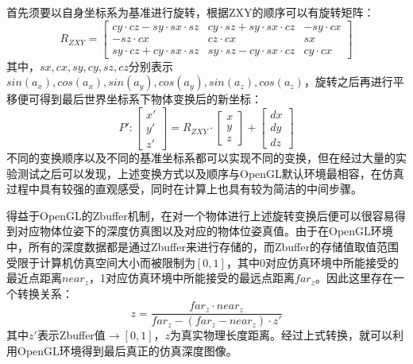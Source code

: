 首先须要以自身坐标系为基准进行旋转，根据ZXY的顺序可以有旋转矩阵：
\begin{equation}
	R_{ZXY}=
	\begin{bmatrix} 
	cy\cdot cz-sy\cdot sx\cdot sz & cy\cdot sz+sy\cdot sx\cdot cz & -sy\cdot cx \\
	-sz\cdot cx & cz\cdot cx & sx \\
	sy\cdot cz+cy\cdot sx\cdot sz & sy\cdot sz-cy\cdot sx\cdot cz & cy\cdot cx 
	\end{bmatrix} 
\end{equation}
其中，$sx,cx,sy,cy,sz,cz$分别表示$sin(a_x),cos(a_x),sin(a_y),cos(a_y),sin(a_z),cos(a_z)$，旋转之后再进行平移便可得到最后世界坐标系下物体变换后的新坐标：
\begin{equation}
	P':\left[\begin{aligned}x' \\y' \\ z'\end{aligned}\right]=
	R_{ZXY}\cdot \left[\begin{aligned}x \\y \\ z\end{aligned}\right]+
	\left[\begin{aligned}dx \\dy \\ dz\end{aligned}\right]
\end{equation}
不同的变换顺序以及不同的基准坐标系都可以实现不同的变换，但在经过大量的实验测试之后可以发现，上述变换方式以及顺序与OpenGL默认环境最相容，在仿真过程中具有较强的直观感受，同时在计算上也具有较为简洁的中间步骤。

得益于OpenGL的Zbuffer机制，在对一个物体进行上述旋转变换后便可以很容易得到对应物体位姿下的深度仿真图以及对应的物体位姿真值。由于在OpenGL环境中，所有的深度数据都是通过Zbuffer来进行存储的，而Zbuffer的存储值取值范围受限于计算机仿真空间大小而被限制为$[0,1]$，其中0对应仿真环境中所能接受的最近点距离$near_z$，1对应仿真环境中所能接受的最远点距离$far_z$。因此这里存在一个转换关系：
\begin{equation}
	z=\frac{far_z\cdot near_z}{far_z - (far_z-near_z)\cdot z'}
\end{equation}
其中$z'$表示Zbuffer值$\to [0,1]$，$z$为真实物理长度距离。经过上式转换，就可以利用OpenGL环境得到最后真正的仿真深度图像。

